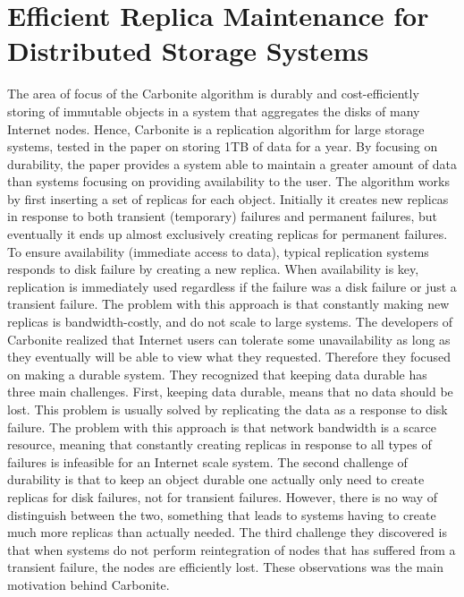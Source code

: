 \documentclass{article}
\begin{document}
\section*{Efficient Replica Maintenance for Distributed Storage Systems}

The area of focus of the Carbonite algorithm is durably and cost-efficiently storing of immutable objects in a system that aggregates the disks of many Internet nodes. Hence, Carbonite is a replication algorithm for large storage systems, tested in the paper on storing 1TB of data for a year. By focusing on durability, the paper provides a system able to maintain a greater amount of data than systems focusing on providing availability to the user. The algorithm works by first inserting a set of replicas for each object. Initially it creates new replicas in response to both transient (temporary) failures and permanent failures, but eventually it ends up almost exclusively creating replicas for permanent failures. \\

\noindent To ensure availability (immediate access to data), typical replication systems responds to disk failure by creating a new replica. When availability is key, replication is immediately used regardless if the failure was a disk failure or just a transient failure. The problem with this approach is that constantly making new replicas is bandwidth-costly, and do not scale to large systems. The developers of Carbonite realized that Internet users can tolerate some unavailability as long as they eventually will be able to view what they requested. Therefore they focused on making a durable system. They recognized that keeping data durable has three main challenges. First, keeping data durable, means that no data should be lost. This problem is usually solved by replicating the data as a response to disk failure. The problem with this approach is that network bandwidth is a scarce resource, meaning that constantly creating replicas in response to all types of failures is infeasible for an Internet scale system. The second challenge of durability is that to keep an object durable one actually only need to create replicas for disk failures, not for transient failures. However, there is no way of distinguish between the two, something that leads to systems having to create much more replicas than actually needed. The third challenge they discovered is that when systems do not perform reintegration of nodes that has suffered from a transient failure, the nodes are efficiently lost. These observations was the main motivation behind Carbonite.\\
\end{document}
